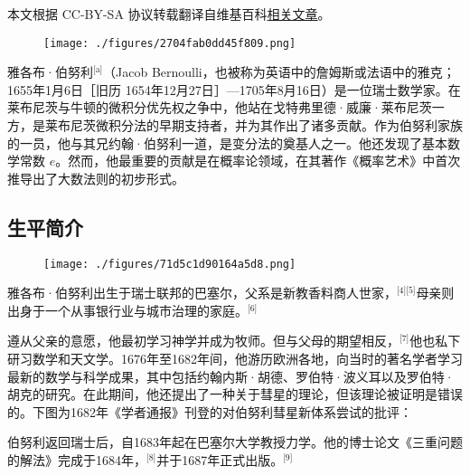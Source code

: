 
本文根据 CC-BY-SA 协议转载翻译自维基百科\href{https://en.wikipedia.org/wiki/Jacob_Bernoulli}{相关文章}。

\begin{figure}[ht]
\centering
\texttt{[image: ./figures/2704fab0dd45f809.png]}
\caption{} \label{fig_YGBbnl_1}
\end{figure}
雅各布·伯努利\(^\text{[a]}\)（Jacob Bernoulli，也被称为英语中的詹姆斯或法语中的雅克；1655年1月6日［旧历 1654年12月27日］—1705年8月16日）是一位瑞士数学家。在莱布尼茨与牛顿的微积分优先权之争中，他站在戈特弗里德·威廉·莱布尼茨一方，是莱布尼茨微积分法的早期支持者，并为其作出了诸多贡献。作为伯努利家族的一员，他与其兄约翰·伯努利一道，是变分法的奠基人之一。他还发现了基本数学常数 $e$。然而，他最重要的贡献是在概率论领域，在其著作《概率艺术》中首次推导出了大数法则的初步形式。
\subsection{生平简介}
\begin{figure}[ht]
\centering
\texttt{[image: ./figures/71d5c1d90164a5d8.png]}
\caption{} \label{fig_YGBbnl_2}
\end{figure}
雅各布·伯努利出生于瑞士联邦的巴塞尔，父系是新教香料商人世家，\(^\text{[4][5]}\)母亲则出身于一个从事银行业与城市治理的家庭。\(^\text{[6]}\)

遵从父亲的意愿，他最初学习神学并成为牧师。但与父母的期望相反，\(^\text{[7]}\)他也私下研习数学和天文学。1676年至1682年间，他游历欧洲各地，向当时的著名学者学习最新的数学与科学成果，其中包括约翰内斯·胡德、罗伯特·波义耳以及罗伯特·胡克的研究。在此期间，他还提出了一种关于彗星的理论，但该理论被证明是错误的。下图为1682年《学者通报》刊登的对伯努利彗星新体系尝试的批评：

伯努利返回瑞士后，自1683年起在巴塞尔大学教授力学。他的博士论文《三重问题的解法》完成于1684年，\(^\text{[8]}\)并于1687年正式出版。\(^\text{[9]}\)
